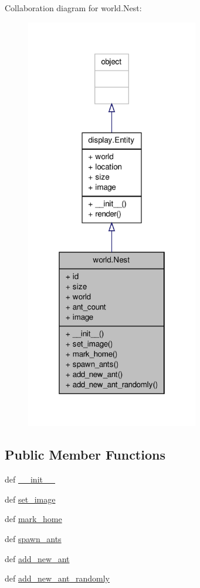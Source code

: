 Collaboration diagram for world.\+Nest\+:
\nopagebreak
\begin{figure}[H]
\begin{center}
\leavevmode
\includegraphics[width=214pt]{classworld_1_1Nest__coll__graph}
\end{center}
\end{figure}
\subsection*{Public Member Functions}
\begin{DoxyCompactItemize}
\item 
def \hyperlink{classworld_1_1Nest_a76e2fb1c7adfc7b4843bd9a1491c67f7}{\+\_\+\+\_\+init\+\_\+\+\_\+}
\item 
def \hyperlink{classworld_1_1Nest_a91914c56d2849f47dfd2b2ad97996fb6}{set\+\_\+image}
\item 
def \hyperlink{classworld_1_1Nest_a4a57d2cea404003ee77306758e9da3e1}{mark\+\_\+home}
\item 
def \hyperlink{classworld_1_1Nest_a756db917e2fa8aeb72c5277637822a53}{spawn\+\_\+ants}
\item 
def \hyperlink{classworld_1_1Nest_a0b76a02840f15fe7909859d523736a58}{add\+\_\+new\+\_\+ant}
\item 
def \hyperlink{classworld_1_1Nest_ac845bc370bbb778a45a360145a48be61}{add\+\_\+new\+\_\+ant\+\_\+randomly}
\end{DoxyCompactItemize}
